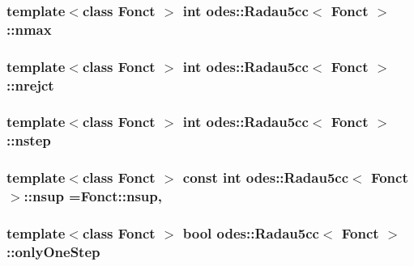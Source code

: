 \hypertarget{classodes_1_1Radau5cc_a42980e5cf06bc0f4c1a0ef1a1922615f}{
\subsubsection[{nmax}]{\setlength{\rightskip}{0pt plus 5cm}template$<$class Fonct $>$ int {\bf odes\-::\-Radau5cc}$<$ Fonct $>$\-::nmax\hspace{0.3cm}{\ttfamily [private]}}}\label{classodes_1_1Radau5cc_a42980e5cf06bc0f4c1a0ef1a1922615f}
\hypertarget{classodes_1_1Radau5cc_a04e6193a9f5be15a7e969b2ad4e5f344}{
\subsubsection[{nrejct}]{\setlength{\rightskip}{0pt plus 5cm}template$<$class Fonct $>$ int {\bf odes\-::\-Radau5cc}$<$ Fonct $>$\-::nrejct\hspace{0.3cm}{\ttfamily [private]}}}\label{classodes_1_1Radau5cc_a04e6193a9f5be15a7e969b2ad4e5f344}
\hypertarget{classodes_1_1Radau5cc_af1a16f749cd5fd53c66af9a913a37d0a}{
\subsubsection[{nstep}]{\setlength{\rightskip}{0pt plus 5cm}template$<$class Fonct $>$ int {\bf odes\-::\-Radau5cc}$<$ Fonct $>$\-::nstep\hspace{0.3cm}{\ttfamily [private]}}}\label{classodes_1_1Radau5cc_af1a16f749cd5fd53c66af9a913a37d0a}
\hypertarget{classodes_1_1Radau5cc_a4e80b8064e4d8f60262591531fcd1ff0}{
\subsubsection[{nsup}]{\setlength{\rightskip}{0pt plus 5cm}template$<$class Fonct $>$ const int {\bf odes\-::\-Radau5cc}$<$ Fonct $>$\-::nsup =Fonct\-::nsup\hspace{0.3cm}{\ttfamily [static]}, {\ttfamily [private]}}}\label{classodes_1_1Radau5cc_a4e80b8064e4d8f60262591531fcd1ff0}
\hypertarget{classodes_1_1Radau5cc_a99fc26950c9004ac83c8b16f8cc41070}{
\subsubsection[{only\-One\-Step}]{\setlength{\rightskip}{0pt plus 5cm}template$<$class Fonct $>$ bool {\bf odes\-::\-Radau5cc}$<$ Fonct $>$\-::only\-One\-Step\hspace{0.3cm}{\ttfamily [private]}}}\label{classodes_1_1Radau5cc_a99fc26950c9004ac83c8b16f8cc41070}
